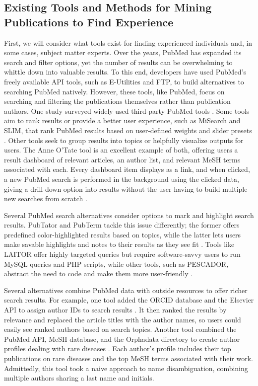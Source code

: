 \subsection{Existing Tools and Methods for Mining Publications to Find Experience}

First, we will consider what tools exist for finding experienced individuals and, in some cases, subject matter experts. Over the years, PubMed has expanded its search and filter options, yet the number of results can be overwhelming to whittle down into valuable results. To this end, developers have used PubMed's freely available API tools, such as E-Utilities and FTP, to build alternatives to searching PubMed natively. However, these tools, like PubMed, focus on searching and filtering the publications themselves rather than publication authors. One study surveyed widely used third-party PubMed tools \cite{ref-pubmed-tools}. Some tools aim to rank results or provide a better user experience, such as MiSearch and SLIM, that rank PubMed results based on user-defined weights and slider presets \cite{ref-pubmed-misearch}. Other tools seek to group results into topics or helpfully visualize outputs for users. The Anne O'Tate tool is an excellent example of both, offering users a result dashboard of relevant articles, an author list, and relevant MeSH terms associated with each. Every dashboard item displays as a link, and when clicked, a new PubMed search is performed in the background using the clicked data, giving a drill-down option into results without the user having to build multiple new searches from scratch \cite{ref-pubmed-anne-otate}. 

Several PubMed search alternatives consider options to mark and highlight search results. PubTator and PubTerm tackle this issue differently; the former offers predefined color-highlighted results based on topics, while the latter lets users make savable highlights and notes to their results as they see fit \cite{ref-pubmed-pubterm, ref-pubmed-pubtator}. Tools like LAITOR offer highly targeted queries but require software-savvy users to run MySQL queries and PHP scripts, while other tools, such as PESCADOR, abstract the need to code and make them more user-friendly \cite{ref-pubmed-pescador}.

Several alternatives combine PubMed data with outside resources to offer richer search results. For example, one tool added the ORCID database and the Elsevier API to assign author IDs to search results \cite{ref-pubmed-pmsc}. It then ranked the results by relevance and replaced the article titles with the author names, so users could easily see ranked authors based on search topics. Another tool combined the PubMed API, MeSH database, and the Orphadata directory to create author profiles dealing with rare diseases \cite{ref-pubmed-bibiometric}. Each author's profile includes their top publications on rare diseases and the top MeSH terms associated with their work. Admittedly, this tool took a naive approach to name disambiguation, combining multiple authors sharing a last name and initials. 

